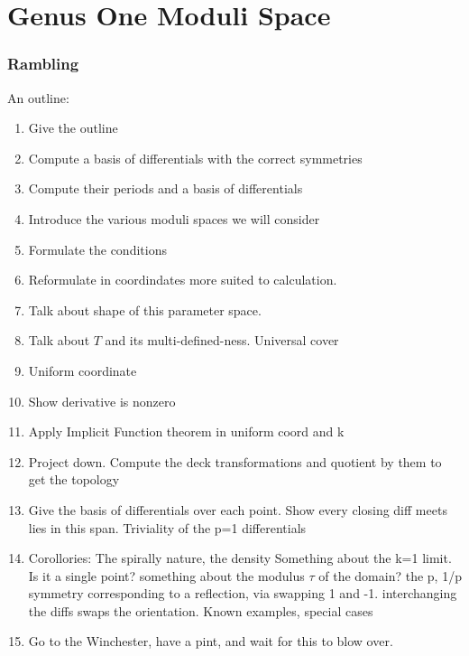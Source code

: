 
\section{Genus One Moduli Space}

\subsubsection{Rambling}

An outline:
\begin{enumerate}
\item
Give the outline
\item
Compute a basis of differentials with the correct symmetries
\item
Compute their periods and a basis of differentials
\item
Introduce the various moduli spaces we will consider
\item
Formulate the conditions
\item
Reformulate in coordindates more suited to calculation.
\item
Talk about shape of this parameter space.
\item
Talk about $T$ and its multi-defined-ness. Universal cover
\item
Uniform coordinate
\item
Show derivative is nonzero
\item
Apply Implicit Function theorem in uniform coord and k
\item
Project down. Compute the deck transformations and quotient by them to get the topology
\item
Give the basis of differentials over each point. Show every closing diff meets lies in this span. Triviality of the p=1 differentials
\item
Corollories:
The spirally nature, the density
Something about the k=1 limit. Is it a single point?
something about the modulus $τ$ of the domain?
the p, 1/p symmetry corresponding to a reflection, via swapping 1 and -1.
interchanging the diffs swaps the orientation.
Known examples, special cases
\item
Go to the Winchester, have a pint, and wait for this to blow over.
\end{enumerate}

